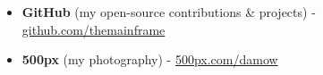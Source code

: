 \begin{itemize}
    \item \textbf{GitHub} (my open-source contributions \& projects) -  \href{https://github.com/themainframe}{github.com/themainframe}
    \item \textbf{500px} (my photography) -  \href{https://500px.com/damow}{500px.com/damow}
\end{itemize}   